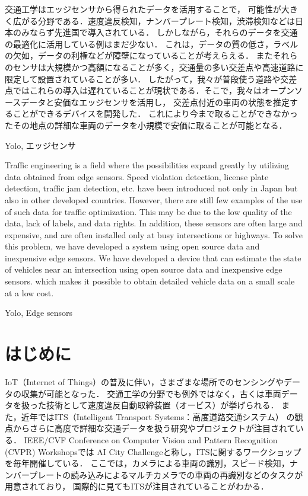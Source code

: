 \documentclass[technicalreport]{ieicej}
\begin{document}
\begin{jabstract}
  交通工学はエッジセンサから得られたデータを活用することで，
  可能性が大きく広がる分野である．速度違反検知，ナンバープレート検知，渋滞検知などは日本のみならず先進国で導入されている．
  しかしながら，それらのデータを交通の最適化に活用している例はまだ少ない．
  これは，データの質の低さ，ラベルの欠如，データの利権などが障壁になっていることが考えらえる．
  またそれらのセンサは大規模かつ高額になることが多く，交通量の多い交差点や高速道路に限定して設置されていることが多い．
  したがって，我々が普段使う道路や交差点ではこれらの導入は遅れていることが現状である．そこで，我々はオープンソースデータと安価なエッジセンサを活用し，
  交差点付近の車両の状態を推定することができるデバイスを開発した．
  これにより今まで取ることができなかったその地点の詳細な車両のデータを小規模で安価に取ることが可能となる．
\end{jabstract}
\begin{jkeyword}
  Yolo, エッジセンサ
\end{jkeyword}
\begin{eabstract}
  Traffic engineering is a field where the possibilities expand greatly by utilizing data obtained from edge sensors. Speed violation detection, license plate detection, traffic jam detection, etc. have been introduced not only in Japan but also in other developed countries.
  However, there are still few examples of the use of such data for traffic optimization.
  This may be due to the low quality of the data, lack of labels, and data rights.
  In addition, these sensors are often large and expensive, and are often installed only at busy intersections or highways.
  To solve this problem, we have developed a system using open source data and inexpensive edge sensors.
  We have developed a device that can estimate the state of vehicles near an intersection using open source data and inexpensive edge sensors.
  which makes it possible to obtain detailed vehicle data on a small scale at a low cost.
\end{eabstract}
\begin{ekeyword}
  Yolo, Edge sensors
\end{ekeyword}
\maketitle

\section{はじめに}
IoT（Internet of Things）の普及に伴い，さまざまな場所でのセンシングやデータの収集が可能となった．
交通工学の分野でも例外ではなく，古くは車両データを扱った技術として速度違反自動取締装置（オービス）が挙げられる．
また，近年ではITS（Intelligent Transport Systems：高度道路交通システム）
の観点からさらに高度で詳細な交通データを扱う研究やプロジェクトが注目されている．
IEEE/CVF Conference on Computer Vision and Pattern Recognition (CVPR) Workshopsでは
AI City Challenge\cite{Naphade_2020_CVPR_Workshops}と称し，ITSに関するワークショップを毎年開催している．
ここでは，カメラによる車両の識別，スピード検知，ナンバープレートの読み込みによるマルチカメラでの車両の再識別などのタスクが用意されており，
国際的に見てもITSが注目されていることがわかる．
\end{document}
